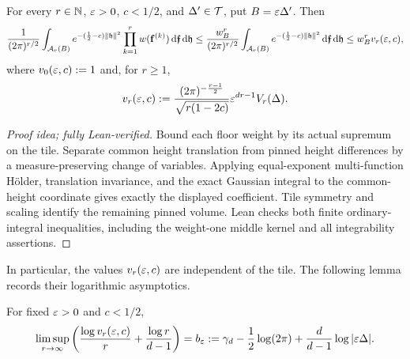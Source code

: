 \documentclass[11pt,letterpaper]{article}
\begin{document}
\begin{lemma}\label{lem:tile-height}
      For every $r\in\mathbb N$, $\varepsilon>0$, $c<1/2$, and $\Delta'\in\mathcal T$, put $B=\varepsilon\Delta'$. Then
      \begin{equation}\label{eq:tile-weight-bound}
            \frac1{(2\pi)^{r/2}}\int_{\mathcal A_r(B)}e^{-(\frac12-c)\|\mathfrak h\|^2}
            \prod_{k=1}^rw(\mathbf f^{(k)})\,\mathrm d\bm{\mathfrak f}\,\mathrm d\mathfrak h
            \le\frac{w_B^r}{(2\pi)^{r/2}}
            \int_{\mathcal A_r(B)}e^{-(\frac12-c)\|\mathfrak h\|^2}\,\mathrm d\bm{\mathfrak f}\,\mathrm d\mathfrak h
            \le w_B^rv_r(\varepsilon,c),
      \end{equation}
      where $v_0(\varepsilon,c):=1$ and, for $r\ge1$,
      \begin{equation}\label{eq:coefficients}
            v_r(\varepsilon,c):=\frac{(2\pi)^{-\frac{r-1}{2}}}{\sqrt{r(1-2c)}}\varepsilon^{dr-1} V_r(\Delta).
      \end{equation}
\end{lemma}

\begin{proof}[Proof idea; fully Lean-verified]
Bound each floor weight by its actual supremum on the tile. Separate common height translation from pinned height differences by a measure-preserving change of variables. Applying equal-exponent multi-function H\"older, translation invariance, and the exact Gaussian integral to the common-height coordinate gives exactly the displayed coefficient. Tile symmetry and scaling identify the remaining pinned volume. Lean checks both finite ordinary-integral inequalities, including the weight-one middle kernel and all integrability assertions.
\end{proof}

In particular, the values $v_r(\varepsilon,c)$ are independent of the tile. The following lemma records their logarithmic asymptotics.

\begin{lemma}
      For fixed $\varepsilon>0$ and $c<1/2$,
      \begin{equation}\label{eq:coefficient-rate}
            \limsup_{r\to\infty}\left(\frac{\log v_r(\varepsilon,c)}{r}+\frac{\log r}{d-1}\right) =b_\varepsilon:=\gamma_d-\frac12\log(2\pi)+\frac d{d-1}\log|\varepsilon\Delta|.
      \end{equation}
\end{lemma}
\end{document}
